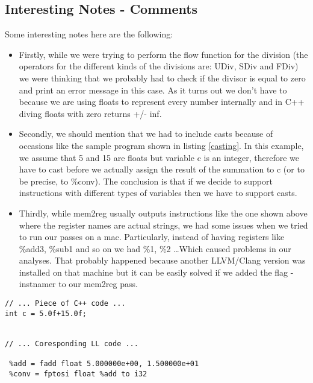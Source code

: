 \subsection*{Interesting Notes - Comments}
Some interesting notes here are the following:



\begin{itemize}

  \item Firstly, while we were trying to perform the flow function for the division (the operators for the different kinds of the divisions are: UDiv, SDiv and FDiv) we were thinking that we probably had to check if the divisor is equal to zero and print an error message in this case. As it turns out we don't have to because we are using floats to represent every number internally and in C++ diving floats with zero returns +/- inf.
  \item Secondly, we should mention that we had to include casts because of occasions like the sample program shown in listing \ref{casting}. In this example, we assume that 5 and 15 are floats but variable c is an integer, therefore we have to cast before we actually assign the result of the summation to c (or to be precise, to \%conv). The conclusion is that if we decide to support instructions with different types of variables then we have to support casts.
  
  \item Thirdly, while mem2reg usually outputs instructions like the one shown above where the register names are actual strings, we had some issues when we tried to run our passes on a mac. Particularly, instead of having registers like \%add3, \%sub1 and so on we had \%1, \%2 \ldots Which caused problems in our analyses. That probably happened because another LLVM/Clang version was installed on that machine but it can be easily solved if we added the flag -instnamer to our mem2reg pass.

\end{itemize}


\begin{lstlisting}[caption=value preservation inside casts, label=casting]
// ... Piece of C++ code ...
int c = 5.0f+15.0f;


// ... Coresponding LL code ...

 %add = fadd float 5.000000e+00, 1.500000e+01
 %conv = fptosi float %add to i32

\end{lstlisting}







  